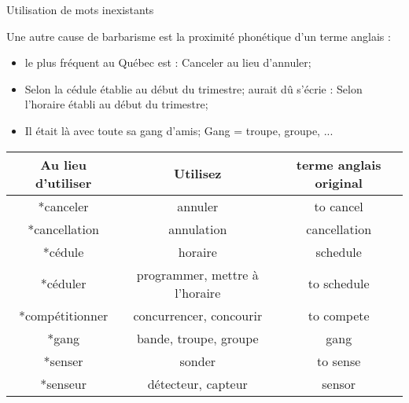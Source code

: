 \documentclass[french]{beamer}
\begin{document}
\begin{frame}{Utilisation de mots inexistants}

Une autre cause de barbarisme est la proximité phonétique d'un terme anglais :
\begin{itemize}
	\item le plus fréquent au Québec est : Canceler au lieu d'annuler;
	\item Selon la cédule établie au début du trimestre; aurait dû s'écrie : Selon l'horaire établi au début du trimestre;
	\item Il était là avec toute sa gang d'amis; Gang = troupe, groupe, ...
\end{itemize}

\begin{center}\small
	\begin{tabular}{ccc}
	\hline 
	Au lieu d'utiliser &  Utilisez & terme anglais original \\ 
	\hline 
	*canceler & annuler & to cancel \\ 
	*cancellation & annulation &  cancellation\\ 
	*cédule & horaire &  schedule\\ 
	*céduler & programmer, mettre à l'horaire & to schedule \\ 
	*compétitionner & concurrencer, concourir  &  to compete\\ 
	*gang& bande, troupe, groupe & gang \\ 
	*senser & sonder & to sense \\ 
	*senseur&  détecteur, capteur & sensor \\ 
	\hline 
\end{tabular} 
\end{center}

\end{frame}
\end{document}

